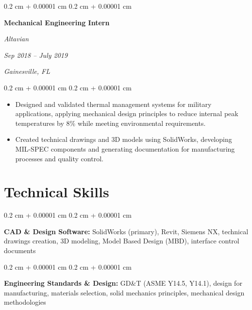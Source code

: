 \documentclass[10pt, letterpaper]{article}
\newenvironment{highlights}{
    \begin{itemize}[
        topsep=0.10 cm,
        parsep=0.10 cm,
        partopsep=0pt,
        itemsep=0pt,
        leftmargin=0.4 cm + 10pt
    ]
}{
    \end{itemize}
} %
\newenvironment{onecolentry}{
    \begin{adjustwidth}{
        0.2 cm + 0.00001 cm
    }{
        0.2 cm + 0.00001 cm
    }
}{
    \end{adjustwidth}
} %
\newenvironment{twocolentry}[2][]{
    \onecolentry
    \def\secondColumn{#2}
    \setcolumnwidth{\fill, 9.0 cm}
    \begin{paracol}{2}
}{
    \switchcolumn \raggedleft \secondColumn
    \end{paracol}
    \endonecolentry
} %
\begin{document}
        \begin{twocolentry}{
            \textit{Sep 2018 – July 2019}
            
            \textit{Gainesville, FL}}
            \textbf{Mechanical Engineering Intern}
            
            \textit{Altavian}
        \end{twocolentry}

        \vspace{0.10 cm}
        \begin{onecolentry}
            \begin{highlights}
                \item Designed and validated thermal management systems for military applications, applying mechanical design principles to reduce internal peak temperatures by 8\% while meeting environmental requirements.
                \item Created technical drawings and 3D models using SolidWorks, developing MIL-SPEC components and generating documentation for manufacturing processes and quality control.
            \end{highlights}
        \end{onecolentry}


\vspace{0.4 cm}


    
    \section{Technical Skills}


        \begin{onecolentry}
            \textbf{CAD \& Design Software:} SolidWorks (primary), Revit, Siemens NX, technical drawings creation, 3D modeling, Model Based Design (MBD), interface control documents
        \end{onecolentry}

        \vspace{0.2 cm}

        \begin{onecolentry}
            \textbf{Engineering Standards \& Design:} GD\&T (ASME Y14.5, Y14.1), design for manufacturing, materials selection, solid mechanics principles, mechanical design methodologies
        \end{onecolentry}

        \vspace{0.2 cm}
\end{document}
